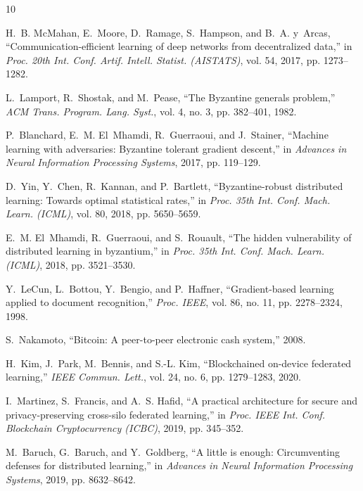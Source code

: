 \documentclass{ieeeaccess}
\begin{document}

\begin{thebibliography}{10}

H.~B. McMahan, E.~Moore, D.~Ramage, S.~Hampson, and B.~A. y~Arcas,
``Communication-efficient learning of deep networks from decentralized data,''
in \emph{Proc. 20th Int. Conf. Artif. Intell. Statist. (AISTATS)}, vol. 54, 2017, pp. 1273--1282.

L.~Lamport, R.~Shostak, and M.~Pease,
``The Byzantine generals problem,''
\emph{ACM Trans. Program. Lang. Syst.}, vol. 4, no. 3, pp. 382--401, 1982.

P.~Blanchard, E.~M. El~Mhamdi, R.~Guerraoui, and J.~Stainer,
``Machine learning with adversaries: Byzantine tolerant gradient descent,''
in \emph{Advances in Neural Information Processing Systems}, 2017, pp. 119--129.

D.~Yin, Y.~Chen, R.~Kannan, and P.~Bartlett,
``Byzantine-robust distributed learning: Towards optimal statistical rates,''
in \emph{Proc. 35th Int. Conf. Mach. Learn. (ICML)}, vol. 80, 2018, pp. 5650--5659.

E.~M. El~Mhamdi, R.~Guerraoui, and S.~Rouault,
``The hidden vulnerability of distributed learning in byzantium,''
in \emph{Proc. 35th Int. Conf. Mach. Learn. (ICML)}, 2018, pp. 3521--3530.

Y.~LeCun, L.~Bottou, Y.~Bengio, and P.~Haffner,
``Gradient-based learning applied to document recognition,''
\emph{Proc. IEEE}, vol. 86, no. 11, pp. 2278--2324, 1998.

S.~Nakamoto,
``Bitcoin: A peer-to-peer electronic cash system,'' 2008.

H.~Kim, J.~Park, M.~Bennis, and S.-L. Kim,
``Blockchained on-device federated learning,''
\emph{IEEE Commun. Lett.}, vol. 24, no. 6, pp. 1279--1283, 2020.

I.~Martinez, S.~Francis, and A.~S. Hafid,
``A practical architecture for secure and privacy-preserving cross-silo federated learning,''
in \emph{Proc. IEEE Int. Conf. Blockchain Cryptocurrency (ICBC)}, 2019, pp. 345--352.

M.~Baruch, G.~Baruch, and Y.~Goldberg,
``A little is enough: Circumventing defenses for distributed learning,''
in \emph{Advances in Neural Information Processing Systems}, 2019, pp. 8632--8642.


\end{thebibliography}
\end{document}
